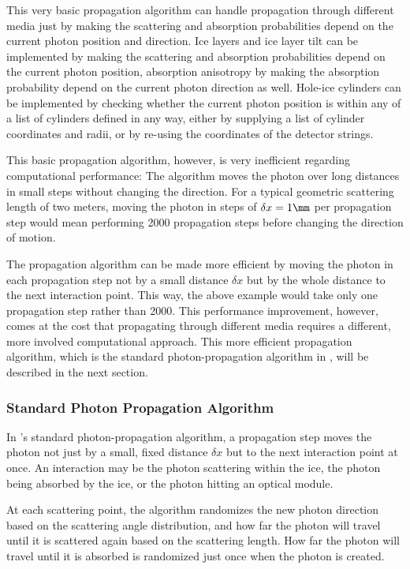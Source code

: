 This very basic propagation algorithm can handle propagation through different media just by making the scattering and absorption probabilities depend on the current photon position and direction.
Ice layers and ice layer tilt can be implemented by making the scattering and absorption probabilities depend on the current photon position, absorption anisotropy by making the absorption probability depend on the current photon direction as well. Hole-ice cylinders can be implemented by checking whether the current photon position is within any of a list of cylinders defined in any way, either by supplying a list of cylinder coordinates and radii, or by re-using the coordinates of the detector strings.

This basic propagation algorithm, however, is very inefficient regarding computational performance: The algorithm moves the photon over long distances in small steps without changing the direction. For a typical geometric scattering length of two meters, moving the photon in steps of $\delta x = 1\mm$ per propagation step would mean performing 2000 propagation steps before changing the direction of motion.

The propagation algorithm can be made more efficient by moving the photon in each propagation step not by a small distance $\delta x$ but by the whole distance to the next interaction point. This way, the above example would take only one propagation step rather than 2000. This performance improvement, however, comes at the cost that propagating through different media requires a different, more involved computational approach. This more efficient propagation algorithm, which is the standard photon-propagation algorithm in \icecube, will be described in the next section.


\subsubsection{Standard Photon Propagation Algorithm}
\label{sec:standardphotonpropagationalgorithm}
\label{sec:standard_photon_propagation_algorithm}
\label{sec:standard_clsim}

In \icecube's standard photon-propagation algorithm, a propagation step moves the photon not just by a small, fixed distance $\delta x$ but to the next interaction point at once. An interaction may be the photon scattering within the ice, the photon being absorbed by the ice, or the photon hitting an optical module. \cite{clsimsource, ppcpaper}

At each scattering point, the algorithm randomizes the new photon direction based on the scattering angle distribution, and how far the photon will travel until it is scattered again based on the scattering length.
How far the photon will travel until it is absorbed is randomized just once when the photon is created.

